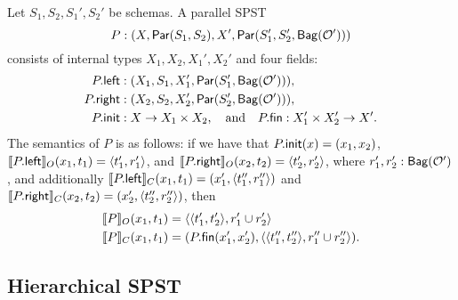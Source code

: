 \begin{definition}
Let $S_1, S_2, S_1', S_2'$ be schemas.
A parallel SPST
\[
P : (X, \parcomp{S_1}{S_2}, X', \parthree{S_1'}{S_2'}{\relleaf{\mathcal{O}'}})
\]
consists of internal types $X_1, X_2, X_1', X_2'$ and
four fields:
\begin{align*}
\spstfield{P}{left} &: (X_1, S_1, X_1', \parcomp{S_1'}{\relleaf{\mathcal{O}'}}), \\
\spstfield{P}{right} &: (X_2, S_2, X_2', \parcomp{S_2'}{\relleaf{\mathcal{O}'}}), \\
\spstfield{P}{init} &: X \to X_1 \times X_2,
\quad \text{and} \quad
\spstfield{P}{fin} : X_1' \times X_2' \to X'.
\end{align*}
The semantics of $P$ is as follows: if we have that
$\spstfield{P}{init}(x) = (x_1, x_2)$,
$\spstsemO{x_1}{t_1}{\spstfield{P}{left}} = \spspar{t_1'}{r_1'}$,
and
$\spstsemO{x_2}{t_2}{\spstfield{P}{right}} = \spspar{t_2'}{r_2'}$,
where $r_1', r_2': \relleaf{\mathcal{O}'}$,
and
additionally $\spstsemC{x_1}{t_1}{\spstfield{P}{left}} = (x_1', \spspar{t_1''}{r_1''})$
and
$\spstsemC{x_2}{t_2}{\spstfield{P}{right}} = (x_2', \spspar{t_2''}{r_2''})$,
then
\begin{align*}
\spstsemO{x_1}{t_1}{P}
    &= \spspar{\spspar{t_1'}{t_2'}}{r_1' \cup r_2'} \\
\spstsemC{x_1}{t_1}{P}
    &= ( \spstfield{P}{fin}(x_1', x_2'),
         \spspar{\spspar{t_1''}{t_2''}}{r_1'' \cup r_2''} ).
\end{align*}
\end{definition}

\subsection{Hierarchical SPST}


